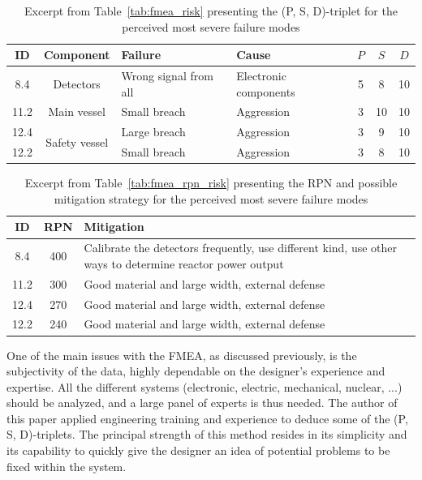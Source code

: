 \begin{table}[!htb]
    \centering
        \begin{tabular}{ccp{4cm}p{4cm}ccc}
            \hline
            ID & Component & Failure & Cause & $P$ & $S$ & $D$ \\ \hline \hline
            8.4 & \multirow{1}{3cm}{Detectors}  & Wrong signal from all & Electronic components & 5 & 8 & 10 \\ \hline
            11.2 & \multirow{1}{3cm}{Main vessel} & Small breach & Aggression & 3 & 10 & 10 \\ \hline
            12.4 & \multirow{2}{3cm}{Safety vessel}  & Large breach & Aggression & 3 & 9 & 10 \\ 
            12.2 &                                   & Small breach & Aggression & 3 & 8 & 10 \\
        \end{tabular}
        \caption{Excerpt from Table~\ref{tab:fmea_risk} presenting the (P, S, D)-triplet for the perceived most severe failure modes}\label{tab:excerpt_fmea}
\end{table}


\begin{table}[!htb]
    \centering
        \begin{tabular}{ccp{10cm}}
            \hline
            ID & RPN & Mitigation \\ \hline\hline
            8.4 & 400  & Calibrate the detectors frequently, use different kind, use other ways to determine reactor power output \\
            11.2 & 300 & Good material and large width, external defense \\
            12.4 & 270 & Good material and large width, external defense \\
            12.2 & 240 & Good material and large width, external defense \\
        \end{tabular}
        \caption{Excerpt from Table~\ref{tab:fmea_rpn_risk} presenting the RPN and possible mitigation strategy for the perceived most severe failure modes}\label{tab:excerpt_rpn_fmea}
\end{table}

One of the main issues with the FMEA, as discussed previously, is the subjectivity of the data, highly dependable on the designer's experience and expertise. All the different systems (electronic, electric, mechanical, nuclear, ...) should be analyzed, and a large panel of experts is thus needed. The author of this paper applied engineering training and experience to deduce some of the (P, S, D)-triplets. The principal strength of this method resides in its simplicity and its capability to quickly give the designer an idea of potential problems to be fixed within the system.


